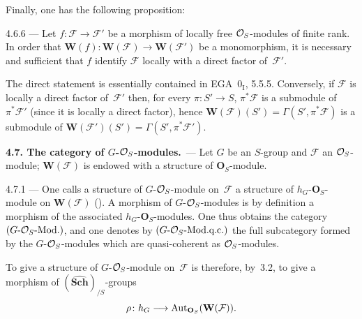 Finally, one has the following proposition:

\begin{proposition}{4.6.6}\label{I.4.6.6}
--- Let \(f \colon \mathcal{F} \to \mathcal{F}'\) be a morphism of locally free \(\mathcal{O}_S\)-modules of finite rank. In order that \(\mathbf{W}(f) \colon \mathbf{W}(\mathcal{F}) \to \mathbf{W}(\mathcal{F}')\) be a monomorphism, it is necessary and sufficient that \(f\) identify \(\mathcal{F}\) locally with a direct factor of~\(\mathcal{F}'\).
\end{proposition}

The direct statement is essentially contained in EGA~\(0_{\mathrm{I}}\), 5.5.5.%
{\renewcommand{\thefootnote}{(36)}}
Conversely, if \(\mathcal{F}\) is locally a direct factor of~\(\mathcal{F}'\) then, for every \(\pi \colon S' \to S\), \(\pi^*\mathcal{F}\) is a submodule of \(\pi^*\mathcal{F}'\) (since it is locally a direct factor), hence \(\mathbf{W}(\mathcal{F})(S') = \Gamma(S', \pi^*\mathcal{F})\) is a submodule of \(\mathbf{W}(\mathcal{F}')(S') = \Gamma(S', \pi^*\mathcal{F}')\).

\par{}
\noindent\textbf{4.7. The category of \(G\)-\(\mathcal{O}_S\)-modules.}\label{I.sec.4.7}\ ---
Let \(G\) be an \(S\)-group and \(\mathcal{F}\) an \(\mathcal{O}_S\)-module; \(\mathbf{W}(\mathcal{F})\) is endowed with a structure of \(\mathbf{O}_S\)-module.

\begin{definition}{4.7.1}\label{I.4.7.1}
--- One calls a structure of \(G\)-\(\mathcal{O}_S\)-module on~\(\mathcal{F}\) a structure of \(h_G\)-\(\mathbf{O}_S\)-module on \(\mathbf{W}(\mathcal{F})\) (). A morphism of \(G\)-\(\mathcal{O}_S\)-modules is by definition a morphism of the associated \(h_G\)-\(\mathbf{O}_S\)-modules. One thus obtains the category \((G\text{-}\mathcal{O}_S\text{-Mod.})\), and one denotes by \((G\text{-}\mathcal{O}_S\text{-Mod.q.c.})\) the full subcategory formed by the \(G\)-\(\mathcal{O}_S\)-modules which are quasi-coherent as \(\mathcal{O}_S\)-modules.
\end{definition}

To give a structure of \(G\)-\(\mathcal{O}_S\)-module on~\(\mathcal{F}\) is therefore, by~3.2, to give a morphism of \((\widehat{\mathbf{Sch}})_{/S}\)-groups
\[
\rho \colon h_G \longrightarrow \operatorname{Aut}_{\mathbf{O}_S}(\mathbf{W}(\mathcal{F})).
\]

